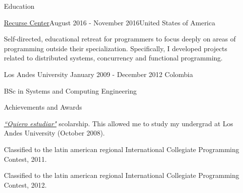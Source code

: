 \documentclass{resume} %
\def\uniandes{Los Andes University }
\begin{document}
\begin{rSection}{Education}

\begin{rSubsection}{\href{https://www.recurse.com/about}{Recurse Center}}{August 2016 - November 2016}{United States of America}
\item Self-directed, educational retreat for programmers to focus deeply on areas of programming outside their specialization. Specifically, I developed projects related to distributed systems, concurrency and functional programming.
\end{rSubsection}

\begin{rSubsection}{\uniandes}{January 2009 - December 2012} {Colombia}
\item BSc in Systems and Computing Engineering  
\end{rSubsection}

\end{rSection}

\begin{rSection}{Achievements and Awards}
\begin{rList}
\item \href{http://losandesfoundation.org/cms31/index.php/quiero-estudiar}{\textsl{``Quiero estudiar"}} scolarship. This allowed me to study my undergrad at Los Andes University (October 2008).
\item Classified to the latin american regional International Collegiate Programming Contest, 2011.
\item Classified to the latin american regional International Collegiate Programming Contest, 2012.
\end{rList}
\end{rSection}

\end{document}
